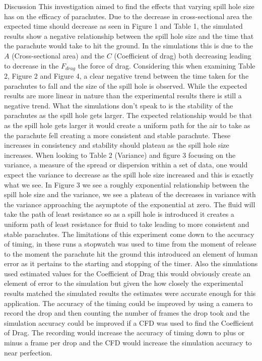 \documentclass[final]{beamer}
\newlength{\colwidth}
\begin{document}
\begin{frame}[t]
\begin{columns}[t]
\begin{column}{\colwidth}
\begin{block}{Discussion}
This investigation aimed to find the effects that varying spill hole size has on the efficacy of parachutes. Due to the decrease in cross-sectional area the expected time should decrease as seen in Figure 1 and Table 1, the simulated results show a negative relationship between the spill hole size and the time that the parachute would take to hit the ground. In the simulations this is due to the $A$ (Cross-sectional area) and the $C$ (Coefficient of drag) both decreasing leading to decrease in the $F_{drag}$ the force of drag. Considering this when examining Table 2, Figure 2 and Figure 4, a clear negative trend between the time taken for the parachutes to fall and the size of the spill hole is observed. While the expected results are more linear in nature than the experimental results there is still a negative trend. What the simulations don't speak to is the stability of the parachutes as the spill hole gets larger. The expected relationship would be that as the spill hole gets larger it would create a uniform path for the air to take as the parachute fell creating a more consistent and stable parachute. These increases in consistency and stability should plateau as the spill hole size increases. When looking to Table 2 (Variance) and figure 3 focusing on the variance, a measure of the spread or dispersion within a set of data, one would expect the variance to decrease as the spill hole size increased and this is exactly what we see. In Figure 3 we see a roughly exponential relationship between the spill hole size and the variance, we see a plateau of the decreases in variance with the variance approaching the asymptote of the exponential at zero. The fluid will take the path of least resistance so as a spill hole is introduced it creates a uniform path of least resistance for fluid to take leading to more consistent and stable parachutes. The limitations of this experiment come down to the accuracy of timing, in these runs a stopwatch was used to time from the moment of release to the moment the parachute hit the ground this introduced an element of human error as it pertains to the starting and stopping of the timer. Also the simulations used estimated values for the Coefficient of Drag this would obviously create an element of error to the simulation but given the how closely the experimental results matched the simulated results the estimates were accurate enough for this application. The accuracy of the timing could be improved by using a camera to record the drop and then counting the number of frames the drop took and the simulation accuracy could be  improved if a CFD was used to find the Coefficient of Drag. The recording would increase the accuracy of timing down to plus or minus a frame per drop and the CFD would increase the simulation accuracy to near perfection.
 \end{block}


\end{column}
\end{columns}
\end{frame}
\end{document}

